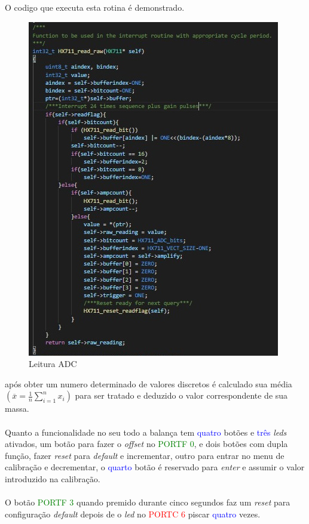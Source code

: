 \newpage
O codigo que executa esta rotina é demonstrado.
\begin{figure}[H]
	\centering
	\includegraphics[scale=0.8]{./image/PESTA/Code/read_raw.jpg}
	\caption{Leitura ADC}
	\label{read_raw}
\end{figure}
após obter um numero determinado de valores discretos é calculado sua média $\left( \overline{x}  =  \frac{1}{n}\sum_{i=1}^n x_i \right)$ para ser tratado e deduzido o valor correspondente de sua massa. \\
\\
Quanto a funcionalidade no seu todo a balança tem \textcolor{blue}{quatro} botões e \textcolor{blue}{três} \textit{leds} ativados, um botão para fazer o \textit{offset} no \textcolor{green}{PORTF 0}, e dois botões com dupla função, fazer \textit{reset} para \textit{default} e incrementar, outro para entrar no menu de calibração e decrementar, o \textcolor{blue}{quarto} botão é reservado para \textit{enter} e assumir o valor introduzido na calibração.\\
\\
O botão \textcolor{green}{PORTF 3} quando premido durante cinco segundos faz um \textit{reset} para configuração \textit{default} depois de o \textit{led} no \textcolor{red}{PORTC 6} piscar \textcolor{blue}{quatro} vezes.\\
